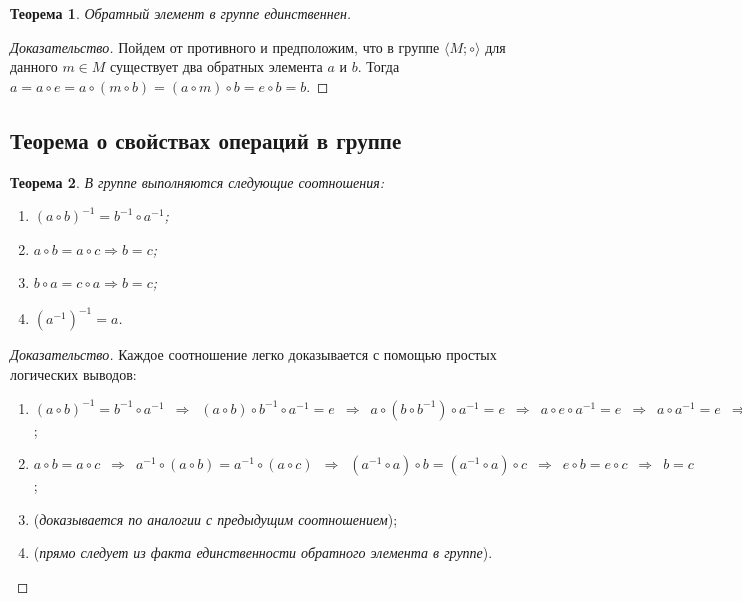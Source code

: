 \documentclass{article}
\newtheorem*{theorem*}{Теорема}
\theoremstyle{plain}
\theoremstyle{definition}
\begin{document}
\begin{theorem*}
	Обратный элемент в группе единственнен.
\end{theorem*}

\begin{proof}[Доказательство]
	Пойдем от противного и предположим, что в группе \(\langle M; \circ \rangle\) для данного \(m \in M\) существует два обратных элемента \(a\) и \(b\). Тогда \(a = a \circ e = a \circ (m \circ b) = (a \circ m) \circ b = e \circ b = b\).
\end{proof}

\subsection{Теорема о свойствах операций в группе}

\begin{theorem*}
	В группе выполняются следующие соотношения:

	\begin{enumerate}
		\item \((a \circ b)^{-1} = b^{-1} \circ a^{-1}\);
		\item \(a \circ b = a \circ c \Rightarrow b = c\);
		\item \(b \circ a = c \circ a \Rightarrow b = c\);
		\item \((a^{-1})^{-1} = a\).  
	\end{enumerate}
\end{theorem*}

\begin{proof}[Доказательство]
	Каждое соотношение легко доказывается с помощью простых логических выводов:

	\begin{enumerate}
		\item \(
			(a \circ b)^{-1} = b^{-1} \circ a^{-1} \enspace \Rightarrow \enspace
			(a \circ b) \circ b^{-1} \circ a^{-1} {= e} \enspace \Rightarrow \enspace
			a \circ (b \circ b^{-1}) \circ a^{-1} {= e} \enspace \Rightarrow \enspace
			a \circ e \circ a^{-1} {= e} \enspace \Rightarrow \enspace
			a \circ a^{-1} {= e} \enspace \Rightarrow \enspace
			e = e
		\);

		\item \(
			a \circ b = a \circ c \enspace \Rightarrow \enspace
			a^{-1} \circ (a \circ b) = a^{-1} \circ (a \circ c) \enspace \Rightarrow \enspace
			(a^{-1} \circ a) \circ b = (a^{-1} \circ a) \circ c \enspace \Rightarrow \enspace
			e \circ b = e \circ c \enspace \Rightarrow \enspace
			b = c
		\);

		\item (\textit{доказывается по аналогии с предыдущим соотношением});

		\item (\textit{прямо следует из факта единственности обратного элемента в группе}).
	\end{enumerate}
\end{proof}
\end{document}
